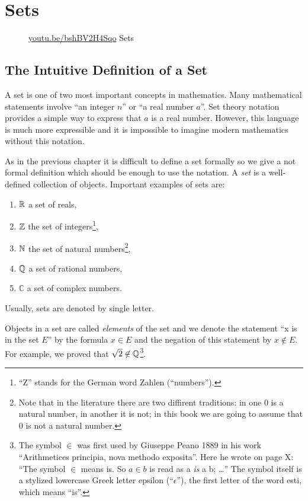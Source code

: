 \chapter{Sets}
\begin{wrapfigure}{l}{4cm}
  \begin{center}
    \vskip -0.5cm
    \vskip 0.25cm
    \href{https://youtu.be/bshBV2H4Sqo}{youtu.be/bshBV2H4Sqo}
    {\footnotesize Sets}
  \end{center}
  \vskip -0.5cm
\end{wrapfigure}
\section{The Intuitive Definition of a Set}
A set is one of two most important concepts in mathematics. Many mathematical
statements involve ``an integer $n$'' or ``a real number $a$''. Set theory
notation provides a simple way to express that $a$ is a real number. However,
this language is much more expressible and it is impossible to imagine modern
mathematics without this notation.

As in the previous chapter it is difficult to define a set formally so we give
a not formal definition which should be enough to use the notation.
A \textit{set} is a well-defined collection of objects. Important examples of
sets are:
\begin{enumerate}
  \item $\mathbb{R}$ a set of reals,
  \item $\mathbb{Z}$ the set of integers\footnote{``Z'' stands for the German word
    Zahlen (``numbers'').},
  \item $\mathbb{N}$ the set of natural numbers\footnote{Note that in the literature
      there are two diffirent traditions: in one $0$ is a natural number, in
      another it is not; in this book we are going to assume that $0$ is not a
      natural number.
    },
  \item $\mathbb{Q}$ a set of rational numbers,
  \item $\mathbb{C}$ a set of complex numbers.
\end{enumerate}
Usually, sets are denoted by single letter.

Objects in a set are called \textit{elements} of the set and we denote the
statement ``x is in the set $E$'' by the formula $x \in E$ and the negation of
this statement by $x \not\in E$. For example, we proved that
$\sqrt{2} \not\in \mathbb{Q}$\footnote{%
  The symbol $\in$ was first used by Giuseppe Peano 1889 in his work
  ``Arithmetices principia, nova methodo exposita''. Here he wrote on page X:
  ``The symbol $\in$ means is. So $a \in b$ is read as a \textit{is} a b;
  \dots''
  The symbol itself is a stylized lowercase Greek letter epsilon
  (``$\epsilon$''), the first letter of the word  \textgreek{esti}, which means
  ``is''.
}.

